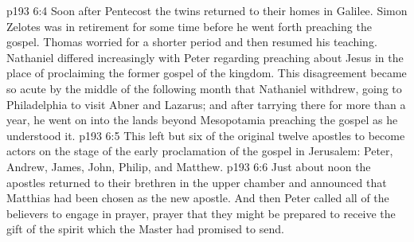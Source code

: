 \vs p193 6:4 \pc Soon after Pentecost the twins returned to their homes in Galilee. Simon Zelotes was in retirement for some time before he went forth preaching the gospel. Thomas worried for a shorter period and then resumed his teaching. Nathaniel differed increasingly with Peter regarding preaching about Jesus in the place of proclaiming the former gospel of the kingdom. This disagreement became so acute by the middle of the following month that Nathaniel withdrew, going to Philadelphia to visit Abner and Lazarus; and after tarrying there for more than a year, he went on into the lands beyond Mesopotamia preaching the gospel as he understood it.
\vs p193 6:5 This left but six of the original twelve apostles to become actors on the stage of the early proclamation of the gospel in Jerusalem: Peter, Andrew, James, John, Philip, and Matthew.
\vs p193 6:6 \pc Just about noon the apostles returned to their brethren in the upper chamber and announced that Matthias had been chosen as the new apostle. And then Peter called all of the believers to engage in prayer, prayer that they might be prepared to receive the gift of the spirit which the Master had promised to send.
\quizlink
